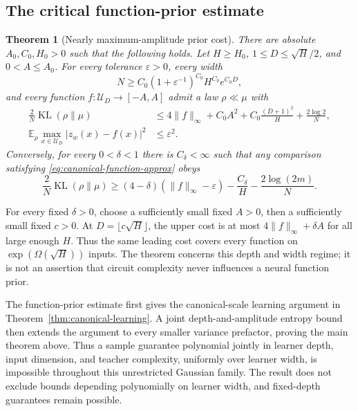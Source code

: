 \documentclass[11pt]{article}
\newtheorem{theorem}{Theorem}[section]\newtheorem{lemma}[theorem]{Lemma}\newtheorem{corollary}[theorem]{Corollary}\newtheorem{proposition}[theorem]{Proposition}
\newcommand{\E}{\mathbb E}\newcommand{\R}{\mathbb R}\newcommand{\KL}{\operatorname{KL}}
\begin{document}
\subsection{The critical function-prior estimate}
\begin{theorem}[Nearly maximum-amplitude prior cost]
\label{thm:canonical-function-memorizer}
There are absolute $A_0,C_0,H_0>0$ such that the following holds. Let $H\ge H_0$, $1\le D\le\sqrt H/2$, and $0<A\le A_0$. For every tolerance $\varepsilon>0$, every width
\[
 N\ge C_0(1+\varepsilon^{-1})^{C_0}H^{C_0}e^{C_0D},
\]
and every function $f:\mathcal U_D\to[-A,A]$ admit a law $\rho\ll\mu$ with
\begin{align}
 \frac2N\KL(\rho\|\mu)
 &\le4\|f\|_\infty+C_0A^2+
 C_0\frac{(D+1)^2}{H}+\frac{2\log2}{N},
 \label{eq:canonical-function-cost}\\
 \E_\rho\max_{x\in\mathcal U_D}|z_w(x)-f(x)|^2&\le\varepsilon^2.
 \label{eq:canonical-function-approx}
\end{align}
Conversely, for every $0<\delta<1$ there is $C_\delta<\infty$ such that any comparison satisfying \eqref{eq:canonical-function-approx} obeys
\begin{equation}
 \frac2N\KL(\rho\|\mu)
 \ge(4-\delta)(\|f\|_\infty-\varepsilon)
       -\frac{C_\delta}{H}-\frac{2\log(2m)}N.
 \label{eq:canonical-function-lower}
\end{equation}
\end{theorem}

For every fixed $\delta>0$, choose a sufficiently small fixed $A>0$, then a sufficiently small fixed $c>0$. At $D=\lfloor c\sqrt H\rfloor$, the upper cost is at most $4\|f\|_\infty+\delta A$ for all large enough $H$. Thus the same leading cost covers every function on $\exp(\Omega(\sqrt H))$ inputs. The theorem concerns this depth and width regime; it is not an assertion that circuit complexity never influences a neural function prior.

The function-prior estimate first gives the canonical-scale learning argument in Theorem~\ref{thm:canonical-learning}. A joint depth-and-amplitude entropy bound then extends the argument to every smaller variance prefactor, proving the main theorem above. Thus a sample guarantee polynomial jointly in learner depth, input dimension, and teacher complexity, uniformly over learner width, is impossible throughout this unrestricted Gaussian family. The result does not exclude bounds depending polynomially on learner width, and fixed-depth guarantees remain possible.
\end{document}
